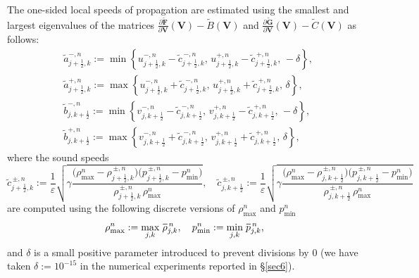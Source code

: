 \documentclass[A4paper,12pt,twoside]{article}
\numberwithin{equation}{section}
\numberwithin{figure}{section}
\numberwithin{table}{section}
\newcommand{\kph}{{k+\frac{1}{2}}}
\newcommand{\jph}{{j+\frac{1}{2}}}
\newcommand{\mF}{\bm{F}}
\newcommand{\mG}{\bm{G}}
\newcommand{\ve}{\varepsilon}
\newcommand*\xbar[1]{%
  \hbox{%
    \vbox{%
      \hrule height 0.5pt %
      \kern0.4ex%
      \hbox{%
        \kern-0.05em%
        \ensuremath{#1}%
        \kern-0.00em%
      }%
    }%
  }%
}
\newcommand{\lore}[1]{{\leavevmode\color{red} #1}}
\begin{document}
The one-sided local speeds of propagation are estimated using the smallest and largest eigenvalues of \lore{the} matrices
$\frac{\partial\widetilde{\mF}}{\partial\bm V}(\bm V)-\widetilde B(\bm V)$ and
$\frac{\partial\widetilde{\mG}}{\partial\bm V}(\bm V)-\widetilde C(\bm V)$ as follows:
\begin{equation}
\begin{aligned}
&\tilde a^{-,n}_{\jph,k}:=\min\left\{u^{-,n}_{\jph,k}-\tilde c^{\,-,n}_{\jph,k},\,u^{+,n}_{\jph,k}-\tilde c^{\,+,n}_{\jph,k},\,-\delta
\right\},\\
&\tilde a^{+,n}_{\jph,k}:=\max\left\{u^{-,n}_{\jph,k}+\tilde c^{\,-,n}_{\jph,k},\,u^{+,n}_{\jph,k}+\tilde c^{\,+,n}_{\jph,k},\,
\delta\right\},\\
&\tilde b^{-,n}_{j,\kph}:=\min\left\{v^{-,n}_{j,\kph}-\tilde c^{\,-,n}_{j,\kph},\,v^{+,n}_{j,\kph}-\tilde c^{\,+,n}_{j,\kph},\,
-\delta\right\},\\
&\tilde b^{+,n}_{j,\kph}:=\max\left\{v^{-,n}_{j,\kph}+\tilde c^{\,-,n}_{j,\kph},\,v^{+,n}_{j,\kph}+\tilde c^{\,+,n}_{j,\kph},\,
\delta\right\},
\end{aligned}
\label{4.49}
\end{equation}
where the sound speeds
$$
\tilde c^{\,\pm,n}_{\jph,k}:=\frac{1}{\ve}\sqrt{\gamma\frac{\big(\rho_{\max}^n-\rho^{\,\pm,n}_{\jph,k}\big)
\big(p^{\,\pm,n}_{\jph,k}-p_{\min}^n)}{\rho^{\,\pm,n}_{\jph,k}\,\rho_{\max}^n}},\quad
\tilde c^{\,\pm,n}_{j,\kph}:=\frac{1}{\ve}\sqrt{\gamma\frac{\big(\rho_{\max}^n-\rho^{\,\pm,n}_{j,\kph}\big)
\big(p^{\,\pm,n}_{j,\kph}-p_{\min}^n)}{\rho^{\,\pm,n}_{j,\kph}\,\rho_{\max}^n}}
$$
are computed using the following discrete versions of $\rho_{\max}^n$ and $p_{\min}^n$
\begin{equation}
\rho_{\max}^n:=\max\limits_{j,k}\,\xbar{\rho}_{j,k}^{\,n},\quad p_{\min}^n:=\min\limits_{j,k}\,\xbar p_{j,k}^{\,n},
\label{3.35}
\end{equation}
and $\delta$ is a small positive parameter introduced to prevent divisions by $0$ (we have taken $\delta:=10^{-15}$ in the numerical
experiments reported in \S\ref{sec6}).
\end{document}
